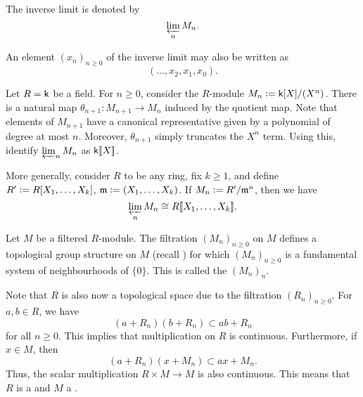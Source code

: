 The inverse limit is denoted by
\begin{equation*} 
	\varprojlim_{n} M_{n}.
\end{equation*}

An element $(x_{n})_{n \ge 0}$ of the inverse limit may also be written as
\begin{equation*} 
	(\ldots, x_{2}, x_{1}, x_{0}).
\end{equation*}

\begin{ex} \label{ex:polynomial-inverse-limit-power-series}
	Let $R = \mathsf{k}$ be a field. For $n \ge 0$, consider the $R$-module $M_{n} \vcentcolon= \mathsf{k}[X]/(X^{n})$. There is a natural map $\theta_{n + 1} : M_{n + 1} \to M_{n}$ induced by the quotient map. \newline
	Note that elements of $M_{n + 1}$ have a canonical representative given by a polynomial of degree at most $n$. Moreover, $\theta_{n + 1}$ simply truncates the $X^{n}$ term. Using this, identify $\varprojlim_{n} M_{n}$ as $\mathsf{k}[\![X]\!]$.

	More generally, consider $R$ to be any ring, fix $k \ge 1$, and define $R' \vcentcolon= R[X_{1}, \ldots, X_{k}]$, $\mathfrak{m} \vcentcolon= (X_{1}, \ldots, X_{k})$. If $M_{n} \vcentcolon= R'/\mathfrak{m}^{n}$, then we have
	\begin{equation*} 
		\varprojlim_{n} M_{n} \cong R[\![X_{1}, \ldots, X_{k}]\!].
	\end{equation*}
\end{ex}

\begin{defn}
	Let $M$ be a filtered $R$-module. The filtration $(M_{n})_{n \ge 0}$ on $M$ defines a topological group structure on $M$ (recall ) for which $(M_{n})_{n \ge 0}$ is a fundamental system of neighbourhoods of $\{0\}$. This is called the  $(M_{n})_{n}$.
\end{defn}

Note that $R$ is also now a topological space due to the filtration $(R_{n})_{n \ge 0}$. For $a, b \in R$, we have
\begin{equation*} 
	(a + R_{n})(b + R_{n}) \subset ab + R_{n}
\end{equation*}
for all $n \ge 0$. This implies that multiplication on $R$ is continuous. Furthermore, if $x \in M$, then
\begin{equation*} 
	(a + R_{n})(x + M_{n}) \subset ax + M_{n}.
\end{equation*}
Thus, the scalar multiplication $R \times M \to M$ is also continuous. This means that $R$ is a  and $M$ a .

